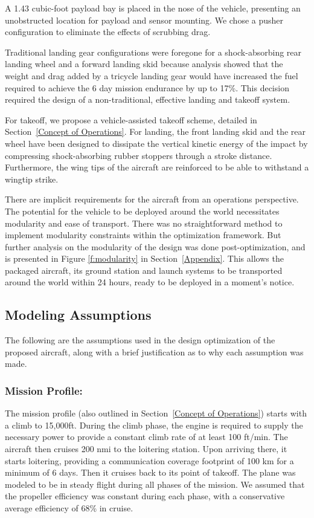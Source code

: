 \documentclass[journal]{aiaa-tc}%
\begin{document}
A 1.43 cubic-foot payload bay is placed in the nose of the vehicle, presenting an unobstructed location for payload and sensor mounting. We chose a pusher configuration to eliminate the effects of scrubbing drag.

Traditional landing gear configurations were foregone for a shock-absorbing rear landing wheel and a forward landing skid because analysis showed that the weight and drag added by a tricycle landing gear would have increased the fuel required to achieve the 6 day mission endurance by up to 17\%. This decision required the design of a non-traditional, effective landing and takeoff system. 

For takeoff, we propose a vehicle-assisted takeoff scheme, detailed in Section~\ref{Concept of Operations}. For landing, the front landing skid and the rear wheel have been designed to dissipate the vertical kinetic energy of the impact by compressing shock-absorbing rubber stoppers through a stroke distance. Furthermore, the wing tips of the aircraft are reinforced to be able to withstand a wingtip strike.

There are implicit requirements for the aircraft from an operations perspective. The potential for the vehicle to be deployed around the world necessitates modularity and ease of transport. There was no straightforward method to implement modularity constraints within the optimization framework. But further analysis on the modularity of the design was done post-optimization, and is presented in Figure \ref{f:modularity} in Section~\ref{Appendix}. This allows the packaged aircraft, its ground station and launch systems to be transported around the world within 24 hours, ready to be deployed in a moment's notice. 

\subsection{Modeling Assumptions}
The following are the assumptions used in the design optimization of the proposed aircraft, along with a brief justification as to why each assumption was made. 

 \subsubsection{Mission Profile:} The mission profile (also outlined in Section~\ref{Concept of Operations}) starts with a climb to 15,000ft. During the climb phase, the engine is required to supply the necessary power to provide a constant climb rate of at least 100 ft/min. The aircraft then cruises 200 nmi to the loitering station. Upon arriving there, it starts loitering, providing a communication coverage footprint of 100 km for a minimum of 6 days. Then it cruises back to its point of takeoff. The plane was modeled to be in steady flight during all phases of the mission. We assumed that the propeller efficiency was constant during each phase, with a conservative average efficiency of 68\% in cruise. 
 
\end{document}
